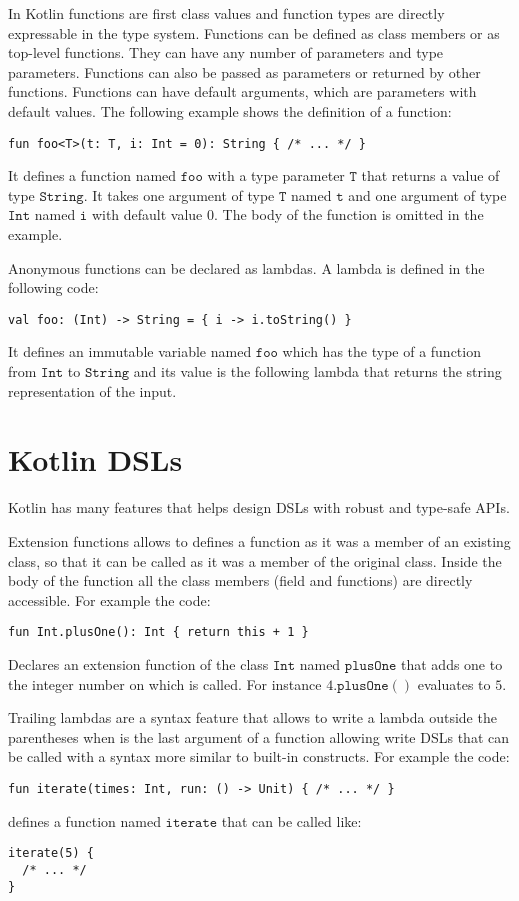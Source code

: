 In Kotlin functions are first class values and function types are directly expressable in the type system. Functions can be defined as class members or as top-level functions. They can have any number of parameters and type parameters. Functions can also be passed as parameters or returned by other functions. Functions can have default arguments, which are parameters with default values. The following example shows the definition of a function:
\begin{lstlisting}[language={kotac}]
fun foo<T>(t: T, i: Int = 0): String { /* ... */ }
\end{lstlisting}
It defines a function named $\mathtt{foo}$ with a type parameter $\mathtt{T}$ that returns a value of type $\mathtt{String}$. It takes one argument of type $\mathtt{T}$ named $\mathtt{t}$ and one argument of type $\mathtt{Int}$ named $\mathtt{i}$ with default value $0$. The body of the function is omitted in the example.

Anonymous functions can be declared as lambdas. A lambda is defined in the following code:
\begin{lstlisting}[language={kotac}]
val foo: (Int) -> String = { i -> i.toString() }
\end{lstlisting}
It defines an immutable variable named $\mathtt{foo}$ which has the type of a function from $\mathtt{Int}$ to $\mathtt{String}$ and its value is the following lambda that returns the string representation of the input.

\section{Kotlin DSLs}

Kotlin has many features that helps design DSLs with robust and type-safe APIs.

Extension functions allows to defines a function as it was a member of an existing class, so that it can be called as it was a member of the original class. Inside the body of the function all the class members (field and functions) are directly accessible.
For example the code:
\begin{lstlisting}[language={kotac}]
fun Int.plusOne(): Int { return this + 1 }
\end{lstlisting}
Declares an extension function of the class $\mathtt{Int}$ named $\mathtt{plusOne}$ that adds one to the integer number on which is called. For instance $4\mathtt{.plusOne()}$ evaluates to $5$.

Trailing lambdas are a syntax feature that allows to write a lambda outside the parentheses when is the last argument of a function allowing write DSLs that can be called with a syntax more similar to built-in constructs. For example the code:
\begin{lstlisting}[language={kotac}]
fun iterate(times: Int, run: () -> Unit) { /* ... */ }
\end{lstlisting}
defines a function named $\mathtt{iterate}$ that can be called like:
\begin{lstlisting}[language={kotac}]
iterate(5) {
  /* ... */
}
\end{lstlisting}

